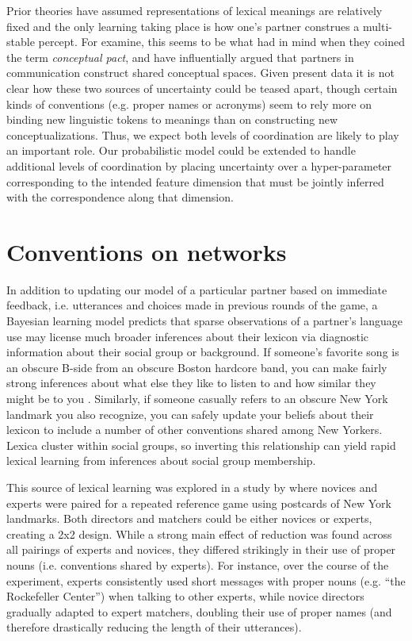 Prior theories have assumed representations of lexical meanings are relatively fixed and the only learning taking place is how one's partner construes a multi-stable percept. 
For examine, this seems to be what  had in mind when they coined the term \emph{conceptual pact}, and \cite{stolk2016conceptual} have influentially argued that partners in communication construct shared conceptual spaces. 
Given present data it is not clear how these two sources of uncertainty could be teased apart, though certain kinds of conventions (e.g. proper names or acronyms) seem to rely more on binding new linguistic tokens to meanings than on constructing new conceptualizations.
Thus, we expect both levels of coordination are likely to play an important role. 
Our probabilistic model could be extended to handle additional levels of coordination by placing uncertainty over a hyper-parameter corresponding to the intended feature dimension that must be jointly inferred with the correspondence along that dimension. 

\section{Conventions on networks}

In addition to updating our model of a particular partner based on immediate feedback, i.e. utterances and choices made in previous rounds of the game, a Bayesian learning model predicts that sparse observations of a partner's language use may license much broader inferences about their lexicon via diagnostic information about their social group or background. If someone's favorite song is an obscure B-side from an obscure Boston hardcore band, you can make fairly strong inferences about what else they like to listen to and how similar they might be to you \cite{VelezEtAl16_Overlaps, GershmanEtAl17_StructureSocialInfluence}. Similarly, if someone casually refers to an obscure New York landmark you also recognize, you can safely update your beliefs about their lexicon to include a number of other conventions shared among New Yorkers. Lexica cluster within social groups, so inverting this relationship can yield rapid lexical learning from inferences about social group membership.

This source of lexical learning was explored in a study by  where novices and experts were paired for a repeated reference game using postcards of New York landmarks. Both directors and matchers could be either novices or experts, creating a 2x2 design. While a strong main effect of reduction was found across all pairings of experts and novices, they differed strikingly in their use of proper nouns (i.e. conventions shared by experts). For instance, over the course of the experiment, experts consistently used short messages with proper nouns (e.g. ``the Rockefeller Center'') when talking to other experts, while novice directors gradually adapted to expert matchers, doubling their use of proper names (and therefore drastically reducing the length of their utterances).


